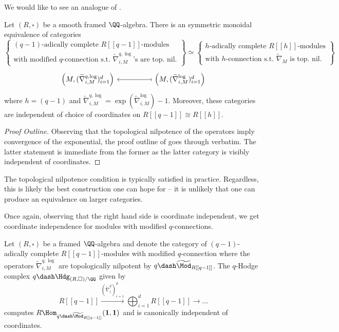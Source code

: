 We would like to see an analogue of . 
\begin{proposition}\label{prop: R-modules with modified connection}
    Let $(R,\square)$ be a smooth framed $\QQ$-algebra. There is an symmetric monoidal equivalence of categories 
    $$\left\{\substack{(q-1)\text{-adically complete }R[[q-1]]\text{-modules} \\ \text{with modified }q\text{-connection s.t. }\widetilde{\nabla}^{q,\log}_{i,M}\text{'s are top. nil.}}\right\}\simeq\left\{\substack{h\text{-adically complete }R[[h]]\text{-modules} \\ \text{with }h\text{-connection s.t. }\widetilde{\nabla}_{M}\text{ is top. nil.}}\right\}$$
    $$%
    \begin{tikzcd}
        {\left(M,(\widetilde{\nabla}^{q,\log}_{i,M})_{i=1}^{d}\right)} && {\left(M,(\widetilde{\nabla}_{i,M}^{\log})_{i=1}^{d}\right)}
        \arrow[maps to, from=1-3, to=1-1]
    \end{tikzcd}$$
    where $h=(q-1)$ and $\widetilde{\nabla}^{q,\log}_{i,M}=\exp(\widetilde{\nabla}^{\log}_{i,M})-1$. Moreover, these categories are independent of choice of coordinates on $R[[q-1]]\cong R[[h]]$. 
\end{proposition}
\begin{proof}[Proof Outline]
    Observing that the topological nilpotence of the operators imply convergence of the exponential, the proof outline of  goes through verbatim. The latter statement is immediate from the former as the latter category is visibly independent of coordinates.
\end{proof}
\begin{remark}
    The topological nilpotence condition is typically satisfied in practice. Regardless, this is likely the best construction one can hope for -- it is unlikely that one can produce an equivalence on larger categories.  
\end{remark}
Once again, observing that the right hand side is coordinate independent, we get coordinate independence for modules with modified $q$-connections. 
\begin{corollary}\label{corr: modules with modified q-connection are coordinate independent}
    Let $(R,\square)$ be a framed $\QQ$-algebra and denote the category of $(q-1)$-adically complete $R[[q-1]]$-modules with modified $q$-connection where the operators $\widetilde{\nabla}_{i,M}^{q,\log}$ are topologically nilpotent by $q\dash\widetilde{\Mod}_{R[[q-1]]}$. The $q$-Hodge complex $q\dash\Hdg_{(R,\square)/\QQ}$ given by 
    $$R[[q-1]]\xrightarrow{(\widetilde{\nabla}_{i}^{q})_{i=1}^{d}}\bigoplus_{i=1}^{d}R[[q-1]]\longrightarrow\dots$$
    computes $R\Hom_{q\dash\widetilde{\Mod}_{R[[q-1]]}}(\mathbf{1},\mathbf{1})$ and is canonically independent of coordinates.
\end{corollary}
